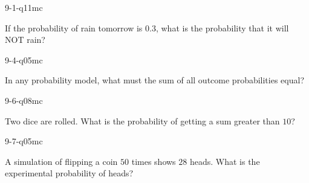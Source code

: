 \begin{practiceQuestion}{9-1-q11}{mc}
\begin{questionText}
If the probability of rain tomorrow is $0.3$, what is the probability that it will NOT rain?
\end{questionText}
\end{practiceQuestion}

\begin{practiceQuestion}{9-4-q05}{mc}
\begin{questionText}
In any probability model, what must the sum of all outcome probabilities equal?
\end{questionText}
\end{practiceQuestion}

\begin{practiceQuestion}{9-6-q08}{mc}
\begin{questionText}
Two dice are rolled. What is the probability of getting a sum greater than $10$?
\end{questionText}
\end{practiceQuestion}

\begin{practiceQuestion}{9-7-q05}{mc}
\begin{questionText}
A simulation of flipping a coin $50$ times shows $28$ heads. What is the experimental probability of heads?
\end{questionText}
\end{practiceQuestion}
